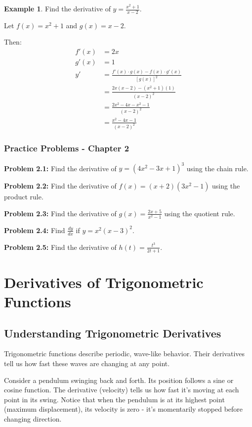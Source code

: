 \documentclass[12pt,a4paper]{book}
\theoremstyle{definition}
\newtheorem{example}{Example}[chapter]
\begin{document}
\begin{example}
Find the derivative of $y = \frac{x^2 + 1}{x - 2}$.

Let $f(x) = x^2 + 1$ and $g(x) = x - 2$.

Then:
\begin{align}
f'(x) &= 2x\\
g'(x) &= 1\\
y' &= \frac{f'(x) \cdot g(x) - f(x) \cdot g'(x)}{[g(x)]^2}\\
&= \frac{2x(x - 2) - (x^2 + 1)(1)}{(x - 2)^2}\\
&= \frac{2x^2 - 4x - x^2 - 1}{(x - 2)^2}\\
&= \frac{x^2 - 4x - 1}{(x - 2)^2}
\end{align}
\end{example}

\subsection{Practice Problems - Chapter 2}

\textbf{Problem 2.1:} Find the derivative of $y = (4x^2 - 3x + 1)^3$ using the chain rule.

\textbf{Problem 2.2:} Find the derivative of $f(x) = (x + 2)(3x^2 - 1)$ using the product rule.

\textbf{Problem 2.3:} Find the derivative of $g(x) = \frac{2x + 5}{x^2 - 1}$ using the quotient rule.

\textbf{Problem 2.4:} Find $\frac{dy}{dx}$ if $y = x^2(x - 3)^2$.

\textbf{Problem 2.5:} Find the derivative of $h(t) = \frac{t^3}{2t + 1}$.

\chapter{Derivatives of Trigonometric Functions}

\section{Understanding Trigonometric Derivatives}

\begin{intuition}
Trigonometric functions describe periodic, wave-like behavior. Their derivatives tell us how fast these waves are changing at any point. 

Consider a pendulum swinging back and forth. Its position follows a sine or cosine function. The derivative (velocity) tells us how fast it's moving at each point in its swing. Notice that when the pendulum is at its highest point (maximum displacement), its velocity is zero - it's momentarily stopped before changing direction.
\end{intuition}
\end{document}
